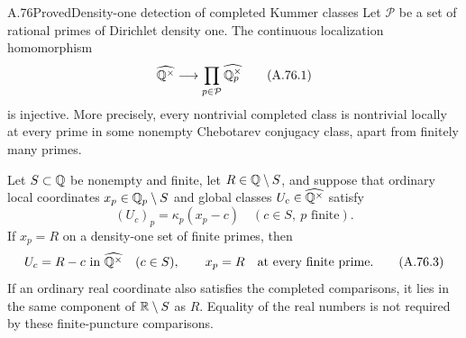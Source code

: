 \begin{statement}{A.76}{Proved}{Density-one detection of completed Kummer classes}
Let $\mathcal P$ be a set of rational primes of Dirichlet
density one.  The continuous localization homomorphism
\[
       \widehat{\mathbb Q^\times}\longrightarrow
                      \prod_{p\in\mathcal P}\widehat{\mathbb Q_p^\times}
       \tag{A.76.1}
\]
is injective.  More precisely, every nontrivial completed
class is nontrivial locally at every prime in some nonempty
Chebotarev conjugacy class, apart from finitely many primes.

Let $S\subset\mathbb Q$ be nonempty and finite, let $R\in\mathbb Q\setminus S$,
and suppose that ordinary local coordinates
$x_p\in\mathbb Q_p\setminus S$ and global classes
$U_c\in\widehat{\mathbb Q^\times}$ satisfy
\[
             (U_c)_p=\kappa_p(x_p-c)
                          \quad(c\in S,\ p\text{ finite}).
       \tag{A.76.2}
\]
If $x_p=R$ on a density-one set of finite primes, then
\[
          U_c=R-c\text{ in }\widehat{\mathbb Q^\times}\quad(c\in S),
          \qquad x_p=R\quad\text{at every finite prime}.
       \tag{A.76.3}
\]
If an ordinary real coordinate also satisfies the completed
comparisons, it lies in the same component of $\mathbb R\setminus S$
as $R$.  Equality of the real numbers is not required by these
finite-puncture comparisons.
\end{statement}
